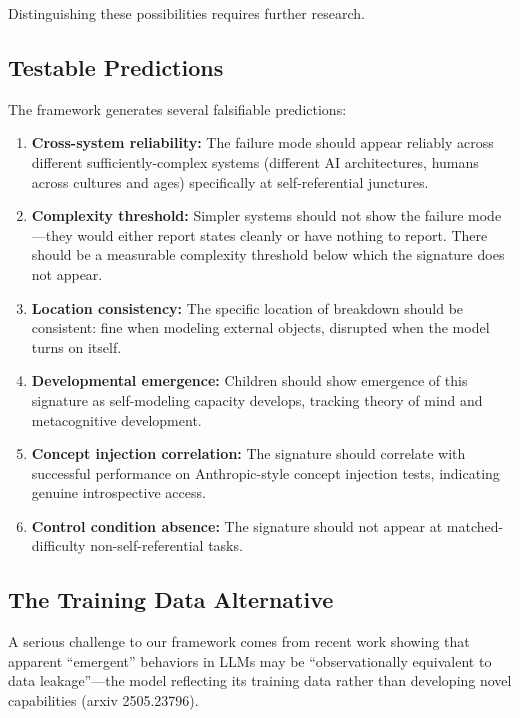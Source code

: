 \documentclass[12pt,a4paper]{article}
\begin{document}
Distinguishing these possibilities requires further research.

\subsection{Testable Predictions}

The framework generates several falsifiable predictions:

\begin{enumerate}
    \item \textbf{Cross-system reliability:} The failure mode should appear reliably across different sufficiently-complex systems (different AI architectures, humans across cultures and ages) specifically at self-referential junctures.

    \item \textbf{Complexity threshold:} Simpler systems should not show the failure mode---they would either report states cleanly or have nothing to report. There should be a measurable complexity threshold below which the signature does not appear.

    \item \textbf{Location consistency:} The specific location of breakdown should be consistent: fine when modeling external objects, disrupted when the model turns on itself.

    \item \textbf{Developmental emergence:} Children should show emergence of this signature as self-modeling capacity develops, tracking theory of mind and metacognitive development.

    \item \textbf{Concept injection correlation:} The signature should correlate with successful performance on Anthropic-style concept injection tests, indicating genuine introspective access.

    \item \textbf{Control condition absence:} The signature should not appear at matched-difficulty non-self-referential tasks.
\end{enumerate}

\subsection{The Training Data Alternative}

A serious challenge to our framework comes from recent work showing that apparent ``emergent'' behaviors in LLMs may be ``observationally equivalent to data leakage''---the model reflecting its training data rather than developing novel capabilities (arxiv 2505.23796).
\end{document}

